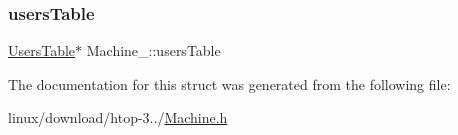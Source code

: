 \mbox{\label{structMachine___af77e01ddf7e141ce1182ec9786163403}} 
\subsubsection{\texorpdfstring{users\+Table}{usersTable}}
{\footnotesize\ttfamily \hyperlink{UsersTable_8h_a6fba6179e89888312f235179e5a04de6}{Users\+Table}$\ast$ Machine\+\_\+\+::users\+Table}



The documentation for this struct was generated from the following file\+:\begin{DoxyCompactItemize}
\item 
linux/download/htop-\/3../\hyperlink{Machine_8h}{Machine.\+h}\end{DoxyCompactItemize}
